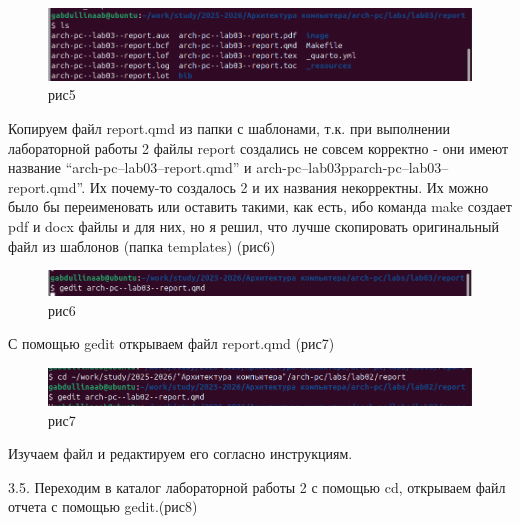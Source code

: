 \documentclass[
  english,
  russian,
  12pt,
  a4paper,
  DIV=11,
  numbers=noendperiod]{scrreprt}
\begin{document}
\begin{figure}

{\centering \includegraphics[width=0.9\linewidth,height=\textheight,keepaspectratio]{image/рис5.png}

}

\caption{рис5}

\end{figure}%

Копируем файл report.qmd из папки с шаблонами, т.к. при выполнении
лабораторной работы 2 файлы report создались не совсем корректно - они
имеют название \enquote{arch-pc--lab03--report.qmd} и
arch-pc--lab03pparch-pc--lab03--report.qmd''. Их почему-то создалось 2 и
их названия некорректны. Их можно было бы переименовать или оставить
такими, как есть, ибо команда make создает pdf и docx файлы и для них,
но я решил, что лучше скопировать оригинальный файл из шаблонов (папка
templates) (рис6)

\begin{figure}

{\centering \includegraphics[width=0.9\linewidth,height=\textheight,keepaspectratio]{image/рис6.png}

}

\caption{рис6}

\end{figure}%

С помощью gedit открываем файл report.qmd (рис7)

\begin{figure}

{\centering \includegraphics[width=0.9\linewidth,height=\textheight,keepaspectratio]{image/рис7.png}

}

\caption{рис7}

\end{figure}%

Изучаем файл и редактируем его согласно инструкциям.

3.5. Переходим в каталог лабораторной работы 2 с помощью cd, открываем
файл отчета с помощью gedit.(рис8)
\end{document}
